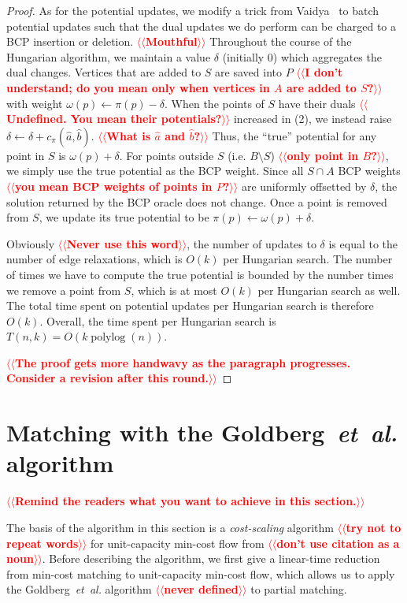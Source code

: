 \documentclass[11pt]{article}
\makeatletter
\def\etal{\textsl{et~al.}}
\def\polylog{\mathop{\mathrm{polylog}}}
\theoremstyle{plain}
\numberwithin{figure}{section}
\def\n@te#1{\textsf{\boldmath \textbf{$\langle\!\langle$#1$\rangle\!\rangle$}}\leavevmode}
\def\note#1{\textcolor{red}{\n@te{#1}}}
\makeatother
\begin{document}
\begin{proof}
As for the potential updates,
we modify a trick from Vaidya~\cite{Vaidya89} to batch potential
updates such that the dual updates we do perform can be charged to a
BCP insertion or deletion. \note{Mouthful}
Throughout the course of the Hungarian algorithm, we maintain a value
$\delta$ (initially 0) which aggregates the dual changes.
Vertices that are added to $S$ are saved into $P$ \note{I don't understand; do you mean only when vertices in $A$ are added to $S$?} with weight
$\omega(p) \gets \pi(p) - \delta$.
When the points of $S$ have their duals \note{Undefined. You mean their potentials?} increased in (2), we instead
raise $\delta \gets \delta + c_\pi(\hat{a}, \hat{b})$. \note{What is $\hat{a}$ and $\hat{b}$?}
Thus, the ``true'' potential for any point in $S$ is
$\omega(p) + \delta$.
For points outside $S$ (i.e. $B \setminus S$) \note{only point in $B$?}, we simply use the true
potential as the BCP weight.
Since all $S \cap A$ BCP weights \note{you mean BCP weights of points in $P$?} are uniformly offsetted by $\delta$, the solution returned by the BCP oracle does not change.
Once a point is removed from $S$, we update its true potential
to be $\pi(p) \gets \omega(p) + \delta$.

Obviously \note{Never use this word}, the number of updates to $\delta$ is equal to the number of
edge relaxations, which is $O(k)$ per Hungarian search.
The number of times we have to compute the true potential is bounded by
the number times we remove a point from $S$, which is at most $O(k)$ per Hungarian search as well.
The total time spent on potential updates per Hungarian search is therefore
$O(k)$.
Overall, the time spent per Hungarian search is $T(n, k) = O(k\polylog(n))$.

\note{The proof gets more handwavy as the paragraph progresses.  Consider a revision after this round.}
\end{proof}


\section{Matching with the Goldberg~{\etal} algorithm}
\label{section:goldberg}

\note{Remind the readers what you want to achieve in this section.}

The basis of the algorithm in this section is a \emph{cost-scaling} algorithm \note{try not to repeat words}
for unit-capacity min-cost flow from \cite{GHKT17} \note{don't use citation as a noun}.
Before describing the algorithm, we first give a linear-time reduction from
min-cost matching to unit-capacity min-cost flow, which allows us to apply the
Goldberg~{\etal} algorithm \note{never defined} to partial matching.
\end{document}

